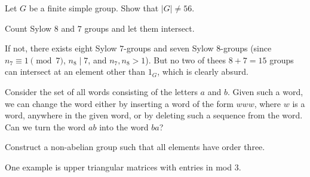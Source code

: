 \begin{problem}
	Let $G$ be a finite simple group.
	Show that $\left\lvert G \right\rvert \neq 56$.
	\begin{hint}
		Count Sylow $8$ and $7$ groups and let them intersect.
	\end{hint}
	\begin{sol}
		If not, there exists eight Sylow $7$-groups and seven Sylow $8$-groups
		(since $n_7 \equiv 1 \pmod 7$, $n_8 \mid 7$, and $n_7, n_8 > 1$).
		But no two of thees $8+7=15$ groups can intersect at an element other than $1_G$,
		which is clearly absurd.
	\end{sol}
\end{problem}

\begin{problem}
	\gim
	Consider the set of all words consisting of the letters $a$ and $b$.
	Given such a word, we can change the word either by inserting a word of the form $www$,
	where $w$ is a word, anywhere in the given word, or by deleting such a sequence from the word.
	Can we turn the word $ab$ into the word $ba$?
	\begin{hint}
		Construct a non-abelian group such that all elements have order three.
	\end{hint}
	\begin{sol}
		One example is upper triangular matrices with entries in mod $3$.
	\end{sol}
\end{problem}

